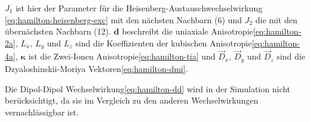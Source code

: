 \documentclass[main.tex]{subfiles}
\begin{document}
\(J_1\) ist hier der Parameter für die Heisenberg-Austauschwechselwirkung
\eqref{eq:hamilton-heisenberg-exc} mit den nächsten Nachbarn (6) und \(J_2\)
die mit den übernächsten Nachbarn (12). \(\bm{d}\)
beschreibt die uniaxiale Anisotropie\eqref{eq:hamilton-2a}, \(L_x\), \(L_y\)
und \(L_z\) sind die Koeffizienten der kubischen
Anisotropie\eqref{eq:hamilton-4a}, \(\bm{\kappa}\) ist die Zwei-Ionen
Anisotropie\eqref{eq:hamilton-tia} und \(\vec{D}_x\), \(\vec{D}_y\) und
\(\vec{D}_z\) sind die Dzyaloshinskii-Moriya Vektoren\eqref{eq:hamilton-dmi}.

Die Dipol-Dipol Wechselwirkung\eqref{eq:hamilton-dd} wird in der Simulation
nicht berücksichtigt, da sie im Vergleich zu den anderen Wechselwirkungen
vernachlässigbar ist.


\end{document}
